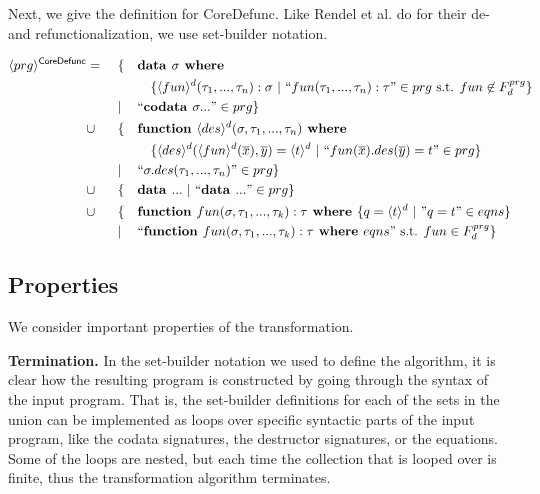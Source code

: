 Next, we give the definition for \textsf{CoreDefunc}. Like Rendel et al. do for their de- and refunctionalization, we use set-builder notation.

\begin{algorithm}

\begin{align*}
\langle prg \rangle^{\textsf{CoreDefunc}} & = ~&& \{ && \textrm{\textbf{data }} \sigma \textrm{\textbf{ where }} \span\span\span\span \\
& && && && \{ \langle fun \rangle^d (\tau_1, ..., \tau_n): \sigma ~ | ~ `` fun(\tau_1, ..., \tau_n): \tau " \in prg \text{ s.t. } fun \not\in F^{prg}_d \} \\
& && | && `` \textrm{\textbf{codata }} \sigma ... " \in prg \} \span\span\span\span \\
& \cup && \{ && \textrm{\textbf{function }} \langle des \rangle^d (\sigma, \tau_1, ..., \tau_n) \textrm{\textbf{ where}} \span\span\span\span \\
& && && && \{ \langle des \rangle^d (\langle fun \rangle^d (\overline{x}), \overline{y}) = \langle t \rangle^d ~ | ~ `` fun(\overline{x}).des(\overline{y}) = t " \in prg \} \\
& && | && `` \sigma.des(\tau_1, ..., \tau_n) " \in prg \} \span\span\span\span \\
& \cup && \{ && \textrm{\textbf{data }} ... ~ | ~ `` \textrm{\textbf{data }} ... " \in prg \} \span\span\span\span \\
& \cup && \{ && \textrm{\textbf{function }} fun(\sigma, \tau_1, ..., \tau_k): \tau \textrm{\textbf{ where }} \{ q = \langle t \rangle^d ~ | ~ "q = t" \in eqns \} \span\span\span\span \\
& && | && `` \textrm{\textbf{function }} fun(\sigma, \tau_1, ..., \tau_k): \tau \textrm{\textbf{ where }} eqns " \text{ s.t. } fun \in F^{prg}_d \} \span\span\span\span
\end{align*}

\end{algorithm}

\subsection{Properties}

We consider important properties of the transformation.

\textbf{Termination.} In the set-builder notation we used to define the algorithm, it is clear how the resulting program is constructed by going through the syntax of the input program. That is, the set-builder definitions for each of the sets in the union can be implemented as loops over specific syntactic parts of the input program, like the codata signatures, the destructor signatures, or the equations. Some of the loops are nested, but each time the collection that is looped over is finite, thus the transformation algorithm terminates.

